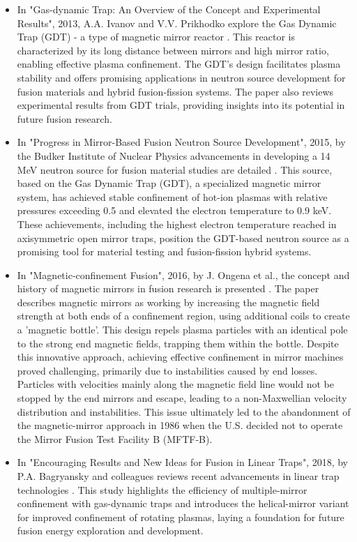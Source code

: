 \begin{itemize}
 \item In "Gas-dynamic Trap: An Overview of the Concept and Experimental Results", 2013, A.A. Ivanov and V.V. Prikhodko explore the Gas Dynamic Trap (GDT) - a type of magnetic mirror reactor \cite{ivanov2013gas}. This reactor is characterized by its long distance between mirrors and high mirror ratio, enabling effective plasma confinement. The GDT's design facilitates plasma stability and offers promising applications in neutron source development for fusion materials and hybrid fusion-fission systems. The paper also reviews experimental results from GDT trials, providing insights into its potential in future fusion research.

  \item In "Progress in Mirror-Based Fusion Neutron Source Development", 2015, by the Budker Institute of Nuclear Physics  advancements in developing a 14 MeV neutron source for fusion material studies are detailed \cite{anikeev2015progress}. This source, based on the Gas Dynamic Trap (GDT), a specialized magnetic mirror system, has achieved stable confinement of hot-ion plasmas with relative pressures exceeding 0.5 and elevated the electron temperature to 0.9 keV. These achievements, including the highest electron temperature reached in axisymmetric open mirror traps, position the GDT-based neutron source as a promising tool for material testing and fusion-fission hybrid systems.

 \item In "Magnetic-confinement Fusion", 2016, by J. Ongena et al., the concept and history of magnetic mirrors in fusion research is presented \cite{ongena2016magnetic}.  The paper describes magnetic mirrors as working by increasing the magnetic field strength at both ends of a confinement region, using additional coils to create a 'magnetic bottle'. This design repels plasma particles with an identical pole to the strong end magnetic fields, trapping them within the bottle. Despite this innovative approach, achieving effective confinement in mirror machines proved challenging, primarily due to instabilities caused by end losses. Particles with velocities mainly along the magnetic field line would not be stopped by the end mirrors and escape, leading to a non-Maxwellian velocity distribution and instabilities. This issue ultimately led to the abandonment of the magnetic-mirror approach in 1986 when the U.S. decided not to operate the Mirror Fusion Test Facility B (MFTF-B).

 \item In "Encouraging Results and New Ideas for Fusion in Linear Traps", 2018, by P.A. Bagryansky and colleagues reviews recent advancements in linear trap technologies \cite{bagryansky2019encouraging}. This study highlights the efficiency of multiple-mirror confinement with gas-dynamic traps and introduces the helical-mirror variant for improved confinement of rotating plasmas, laying a foundation for future fusion energy exploration and development.



\end{itemize}

